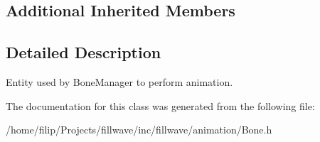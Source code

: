 \subsection*{Additional Inherited Members}


\subsection{Detailed Description}
Entity used by Bone\+Manager to perform animation. 

The documentation for this class was generated from the following file\+:\begin{DoxyCompactItemize}
\item 
/home/filip/\+Projects/fillwave/inc/fillwave/animation/Bone.\+h\end{DoxyCompactItemize}
